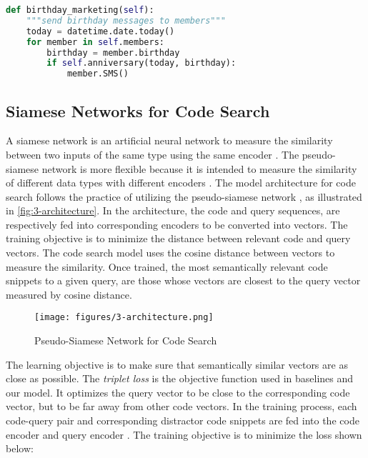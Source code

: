 \documentclass[conference]{IEEEtran}
\begin{document}
\begin{lstlisting}[language=Python,label={lst:demo},caption=A Code Snippet in Python]
def birthday_marketing(self):
    """send birthday messages to members"""
    today = datetime.date.today()
    for member in self.members:
        birthday = member.birthday
        if self.anniversary(today, birthday):
            member.SMS()
\end{lstlisting} 
\subsection{Siamese Networks for Code Search}
\label{sec:intro-siamese}

A siamese network is an artificial neural network to measure the similarity between two inputs of the same type using the same encoder \cite{Zagoruyko2015LearningTC}. The pseudo-siamese network is more flexible because it is intended to measure the similarity of different data types with different encoders \cite{Hughes2018IdentifyingCP}. The model architecture for code search follows the practice of utilizing the pseudo-siamese network \cite{Gu2018DeepCS}, as illustrated in \autoref{fig:3-architecture}. In the architecture, the code and query sequences, are respectively fed into corresponding encoders to be converted into vectors. The training objective is to minimize the distance between relevant code and query vectors. The code search model uses the cosine distance between vectors to measure the similarity. Once trained, the most semantically relevant code snippets to a given query, are those whose vectors are closest to the query vector measured by cosine distance.

\begin{figure}[!htb]
  \centering
  \texttt{[image: figures/3-architecture.png]}
  \caption{Pseudo-Siamese Network for Code Search \cite{Husain2019CodeSearchNetCE}}
  \label{fig:3-architecture}
\end{figure}

The learning objective is to make sure that semantically similar vectors are as close as possible. The \emph{triplet loss} is the objective function used in baselines and our model. It optimizes the query vector to be close to the corresponding code vector, but to be far away from other code vectors.
In the training process, each code-query pair  and corresponding distractor code snippets  are fed into the code encoder  and query encoder . The training objective is to minimize the loss shown below:
\end{document}
